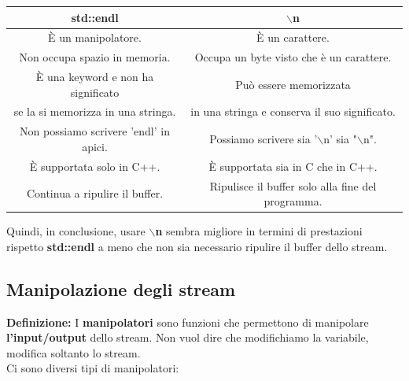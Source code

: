 \begin{tabular}{|c|c|}
	\hline
	\textbf{std::endl} & \textbf{\small $\backslash$n} \\
	\hline
	\textsf{\small È un manipolatore.} & \textsf{\small È un carattere.} \\
	\hline
	\textsf{\small Non occupa spazio in memoria.} & \textsf{\small Occupa un byte visto che è un carattere.} \\
	\hline
	\textsf{\small È una keyword e non ha significato } & \textsf{\small Può essere memorizzata } \\
	\textsf{\small se la si memorizza in una stringa.} & \textsf{\small in una stringa e conserva il suo significato.} \\
	\hline
	\textsf{\small Non possiamo scrivere 'endl' in apici.} & \textsf{\small Possiamo scrivere sia '$\backslash$n' sia "$\backslash$n".} \\
	\hline
	\textsf{\small È supportata solo in C++.} & \textsf{\small È supportata sia in C che in C++.} \\
	\hline
	\textsf{\small Continua a ripulire il buffer.} & \textsf{\small Ripulisce il buffer solo alla fine del programma.} \\
	\hline
\end{tabular}

\textsf{\small Quindi, in conclusione, usare \textbf{$\backslash$n} sembra migliore in termini di prestazioni rispetto \textbf{std::endl} a meno che non sia necessario ripulire il buffer dello stream.} \break

\subsection{Manipolazione degli stream}


\textsf{\small \textbf{Definizione: } I \textbf{manipolatori} sono funzioni che permettono di manipolare \textbf{l'input/output} dello stream. Non vuol dire che modifichiamo la variabile, modifica soltanto lo stream.} \\

\textsf{\small Ci sono diversi tipi di manipolatori: } \\

